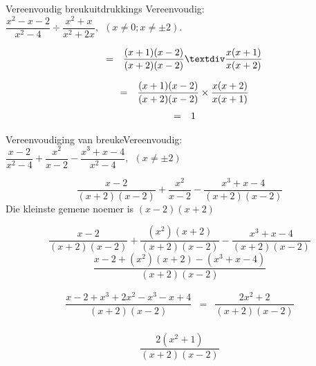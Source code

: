 \begin{wex}{Vereenvoudig breukuitdrukkings }
{Vereenvoudig: $\dfrac{{x}^{2}-x-2}{{x}^{2}-4}÷\dfrac{{x}^{2}+x}{{x}^{2}+2x}, ~~(x \neq 0;x \neq \pm2)$.} 
{
\begin{equation*}
\begin{array}{ccc}& =& \dfrac{(x+1)(x-2)}{(x+2)(x-2)}÷\dfrac{x(x+1)}{x(x+2)}\hfill \end{array}
\end{equation*}


\begin{equation*}
\begin{array}{ccc}& =& \dfrac{(x+1)(x-2)}{(x+2)(x-2)}\ensuremath{\times}\dfrac{x(x+2)}{x(x+1)}\hfill \end{array}
\end{equation*}
\begin{equation*}
\begin{array}{ccc}& =& 1\hfill \end{array}
\end{equation*}
}
\end{wex}


%      
\begin{wex}{Vereenvoudiging van breuke}{Vereenvoudig: $\dfrac{x-2}{{x}^{2}-4}+\dfrac{{x}^{2}}{x-2}-\dfrac{{x}^{3}+x-4}{{x}^{2}-4}, ~~(x \neq \pm2)$}
{
\begin{equation*}
\frac{x-2}{(x+2)(x-2)}+\frac{{x}^{2}}{x-2}-\frac{{x}^{3}+x-4}{(x+2)(x-2)}
\end{equation*}
 Die kleinste gemene noemer is $(x-2)(x+2)$\par 

\begin{equation*}
\frac{x-2}{(x+2)(x-2)}+\frac{({x}^{2})
(x+2)}{(x+2)(x-2)}-\frac{{x}^{3}+x-4}{(x+2)(x-2)}
\end{equation*}
\begin{equation*}
\frac{x-2+({x}^{2})(x+2)-(x^{3}+x-4)}{(x+2)(x-2)}
\end{equation*}

\begin{equation*}
 \begin{array}{llll}
\dfrac{x-2+{x}^{3}+ 2x^{2}-x^{3} - x+4}{(x+2)(x-2)} & = & \dfrac{2x^{2} + 2}{(x+2)(x-2)}\\
\end{array}
\end{equation*}

\begin{equation*}
\dfrac{2({x}^{2}
+1)}{(x+2)(x-2)}
\end{equation*}
}
\end{wex}

